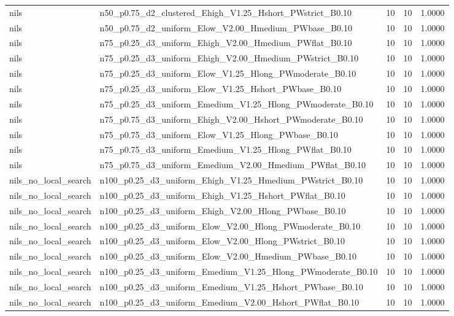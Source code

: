 \begin{tabular}{llrrr}
nils & n50_p0.75_d2_clustered_Ehigh_V1.25_Hshort_PWstrict_B0.10 & 10 & 10 & 1.0000 \\
nils & n50_p0.75_d2_uniform_Elow_V2.00_Hmedium_PWbase_B0.10 & 10 & 10 & 1.0000 \\
nils & n75_p0.25_d3_uniform_Ehigh_V2.00_Hmedium_PWflat_B0.10 & 10 & 10 & 1.0000 \\
nils & n75_p0.25_d3_uniform_Ehigh_V2.00_Hmedium_PWstrict_B0.10 & 10 & 10 & 1.0000 \\
nils & n75_p0.25_d3_uniform_Elow_V1.25_Hlong_PWmoderate_B0.10 & 10 & 10 & 1.0000 \\
nils & n75_p0.25_d3_uniform_Elow_V1.25_Hshort_PWbase_B0.10 & 10 & 10 & 1.0000 \\
nils & n75_p0.25_d3_uniform_Emedium_V1.25_Hlong_PWmoderate_B0.10 & 10 & 10 & 1.0000 \\
nils & n75_p0.75_d3_uniform_Ehigh_V2.00_Hshort_PWmoderate_B0.10 & 10 & 10 & 1.0000 \\
nils & n75_p0.75_d3_uniform_Elow_V1.25_Hlong_PWbase_B0.10 & 10 & 10 & 1.0000 \\
nils & n75_p0.75_d3_uniform_Emedium_V1.25_Hlong_PWflat_B0.10 & 10 & 10 & 1.0000 \\
nils & n75_p0.75_d3_uniform_Emedium_V2.00_Hmedium_PWflat_B0.10 & 10 & 10 & 1.0000 \\
nils_no_local_search & n100_p0.25_d3_uniform_Ehigh_V1.25_Hmedium_PWstrict_B0.10 & 10 & 10 & 1.0000 \\
nils_no_local_search & n100_p0.25_d3_uniform_Ehigh_V1.25_Hshort_PWflat_B0.10 & 10 & 10 & 1.0000 \\
nils_no_local_search & n100_p0.25_d3_uniform_Ehigh_V2.00_Hlong_PWbase_B0.10 & 10 & 10 & 1.0000 \\
nils_no_local_search & n100_p0.25_d3_uniform_Elow_V2.00_Hlong_PWmoderate_B0.10 & 10 & 10 & 1.0000 \\
nils_no_local_search & n100_p0.25_d3_uniform_Elow_V2.00_Hlong_PWstrict_B0.10 & 10 & 10 & 1.0000 \\
nils_no_local_search & n100_p0.25_d3_uniform_Elow_V2.00_Hmedium_PWbase_B0.10 & 10 & 10 & 1.0000 \\
nils_no_local_search & n100_p0.25_d3_uniform_Emedium_V1.25_Hlong_PWmoderate_B0.10 & 10 & 10 & 1.0000 \\
nils_no_local_search & n100_p0.25_d3_uniform_Emedium_V1.25_Hshort_PWbase_B0.10 & 10 & 10 & 1.0000 \\
nils_no_local_search & n100_p0.25_d3_uniform_Emedium_V2.00_Hshort_PWflat_B0.10 & 10 & 10 & 1.0000 \\

\end{tabular}
